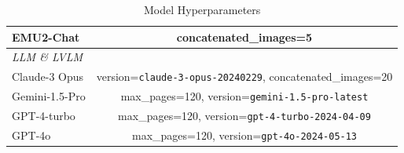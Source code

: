 \begin{table}[!htbp]
{\begin{tabular}{l|c}
        EMU2-Chat & concatenated\_images=5 \\
        \midrule
        \multicolumn{2}{l}{\textit{LLM \& LVLM}} \\
        \midrule
        Claude-3 Opus & version=\texttt{claude-3-opus-20240229}, concatenated\_images=20 \\
        Gemini-1.5-Pro & max\_pages=120, version=\texttt{gemini-1.5-pro-latest} \\
        GPT-4-turbo & max\_pages=120, version=\texttt{gpt-4-turbo-2024-04-09} \\
        GPT-4o & max\_pages=120, version=\texttt{gpt-4o-2024-05-13} \\
        \bottomrule
    \end{tabular}
    }
    \vspace{1em}
    \caption{Model Hyperparameters}
    \label{tab:hyperparameters}
\end{table}
